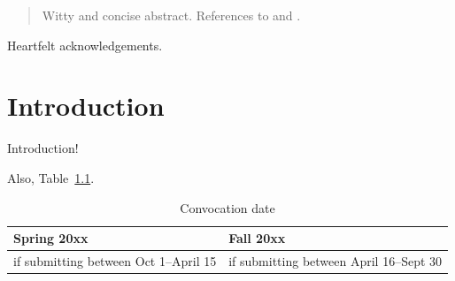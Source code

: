 \documentclass[12pt,openany,oneside]{report}
\begin{document}

\doublespacing

\newpage
\begin{abstract}
  Witty and concise abstract.  References to \cite{MathStats38} and
  \cite{Physicist38}.
\end{abstract}

\onehalfspacing


\begin{acknowledgement}
  Heartfelt acknowledgements.
\end{acknowledgement}



\tableofcontents

\listoftables

\listoffigures


\beginbodyoftex



\chapter{Introduction}

Introduction!

Also, Table~\ref{egtable}.

\begin{table}[htbp]
  \begin{center}
    \begin{tabular}{|p{4cm}|p{4cm}|}
      \hline
      Spring 20xx & Fall 20xx \\
      \hline
      \hline
      if submitting between Oct 1--April 15
      & if submitting between April 16--Sept 30\\
      \hline
    \end{tabular}
    \caption{Convocation date}
    \label{egtable}
  \end{center}
\end{table}
\end{document}
